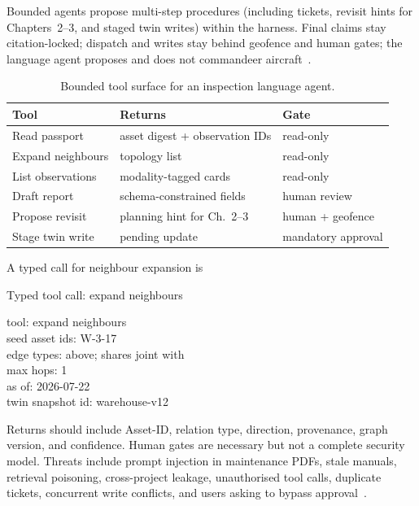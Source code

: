 Bounded agents propose multi-step procedures (including tickets, revisit hints for Chapters~2--3, and staged twin writes) within the harness. Final claims stay citation-locked; dispatch and writes stay behind geofence and human gates; the language agent proposes and does not commandeer aircraft~\cite{yao2023react,luo2025llmdtrobot,gao2026ifcagent,wang2024surveyagents}.

\begin{table}[htbp]
\centering
\caption{Bounded tool surface for an inspection language agent.}
\label{tab:ch8-tools}
\begin{tabular}{llp{5.0cm}}
\toprule
Tool & Returns & Gate \\
\midrule
Read passport & asset digest + observation IDs & read-only \\
Expand neighbours & topology list & read-only \\
List observations & modality-tagged cards & read-only \\
Draft report & schema-constrained fields & human review \\
Propose revisit & planning hint for Ch.~2--3 & human + geofence \\
Stage twin write & pending update & mandatory approval \\
\bottomrule
\end{tabular}
\end{table}

A typed call for neighbour expansion is
\begin{programcode}{Typed tool call: expand neighbours}
\begin{plainlisting}
tool: expand neighbours\\
seed asset ids: W-3-17\\
edge types: above; shares joint with\\
max hops: 1\\
as of: 2026-07-22\\
twin snapshot id: warehouse-v12
\end{plainlisting}
\end{programcode}
Returns should include Asset-ID, relation type, direction, provenance, graph version, and confidence. Human gates are necessary but not a complete security model. Threats include prompt injection in maintenance PDFs, stale manuals, retrieval poisoning, cross-project leakage, unauthorised tool calls, duplicate tickets, concurrent write conflicts, and users asking to bypass approval~\cite{ji2023,saka2024gptconstruction,lee2024ragsafety}.

